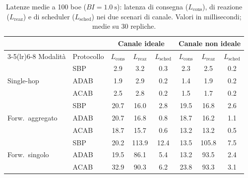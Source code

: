 \begin{table}[htbp]
  \centering
  \caption[Latenze medie a 100 boe]{Latenze medie a 100 boe
  ($BI=\SI{1.0}{\second}$): latenza di consegna ($L_{\text{cons}}$), di
  reazione ($L_{\text{reaz}}$) e di scheduler ($L_{\text{sched}}$) nei due
  scenari di canale. Valori in millisecondi; medie su 30 repliche.}
  \label{tab:latency-summary}
  \small
  \begin{tabular}{llcccccc}
    \toprule
    & & \multicolumn{3}{c}{\textbf{Canale ideale}} & \multicolumn{3}{c}{\textbf{Canale non ideale}} \\
    \cmidrule(lr){3-5}\cmidrule(lr){6-8}
    Modalit\`a & Protocollo & $L_{\text{cons}}$ & $L_{\text{reaz}}$ & $L_{\text{sched}}$
                            & $L_{\text{cons}}$ & $L_{\text{reaz}}$ & $L_{\text{sched}}$ \\
    \midrule
    \multirow{3}{*}{Single-hop}
      & SBP  & 2.9 & 3.2 & 0.3 & 2.3 & 2.5 & 0.2 \\
      & ADAB & 1.9 & 2.9 & 0.2 & 1.4 & 1.9 & 0.2 \\
      & ACAB & 2.5 & 2.8 & 0.2 & 1.5 & 1.7 & 0.2 \\
    \midrule
    \multirow{3}{*}{Forw.\ aggregato}
      & SBP  & 20.7 & 16.0 & 2.8 & 19.5 & 16.8 & 2.6 \\
      & ADAB & 20.7 & 16.8 & 0.8 & 18.7 & 16.2 & 1.1 \\
      & ACAB & 18.7 & 15.7 & 0.6 & 13.2 & 13.2 & 0.5 \\
    \midrule
    \multirow{3}{*}{Forw.\ singolo}
      & SBP  & 20.2 & 113.9 & 12.4 & 13.5 & 105.8 & 7.5 \\
      & ADAB & 19.5 & 86.1  & 5.4  & 13.2 & 93.5  & 2.4 \\
      & ACAB & 32.9 & 90.3  & 6.2  & 23.8 & 93.3  & 3.1 \\
    \bottomrule
  \end{tabular}
\end{table}

